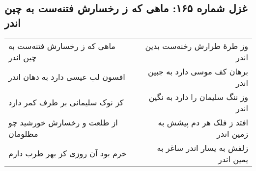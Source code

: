 \begin{center}
\section*{غزل شماره ۱۶۵: ماهی که ز رخسارش فتنه‌ست به چین اندر}
\label{sec:165}
\begin{longtable}{l p{0.5cm} r}
ماهی که ز رخسارش فتنه‌ست به چین اندر
&&
وز طرهٔ طرارش رخنه‌ست بدین اندر
\\
افسون لب عیسی دارد به دهان اندر
&&
برهان کف موسی دارد به جبین اندر
\\
کز نوک سلیمانی بر طرف کمر دارد
&&
وز ننگ سلیمان را دارد به نگین اندر
\\
از طلعت و رخسارش خورشید چو مظلومان
&&
افتد ز فلک هر دم پیشش به زمین اندر
\\
خرم بود آن روزی کز بهر طرب دارم
&&
زلفش به یسار اندر ساغر به یمین اندر
\\
\end{longtable}
\end{center}
